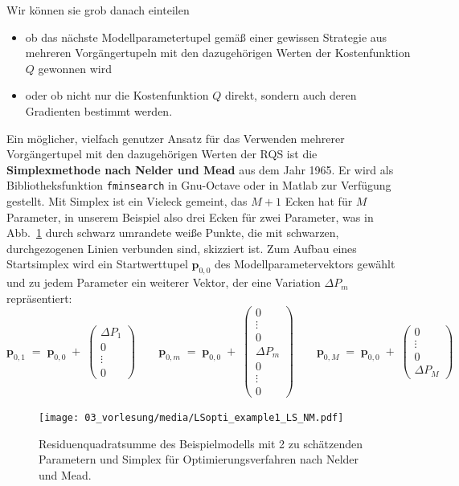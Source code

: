 Wir können sie grob danach einteilen
\begin{itemize}
\item ob das nächste Modellparametertupel gemäß einer gewissen Strategie aus
mehreren Vor\-gänger\-tupeln mit den dazugehörigen Werten der Kostenfunktion $Q$ gewonnen wird
\item oder ob nicht nur die Kostenfunktion $Q$ direkt, sondern auch deren Gradienten bestimmt
werden.
\end{itemize}
Ein möglicher, vielfach genutzer Ansatz für das Verwenden mehrerer Vorgängertupel mit den dazugehörigen Werten der RQS
ist die \textbf{Simplexmethode nach Nelder und Mead} aus dem Jahr 1965. Er wird als Bibliotheksfunktion \texttt{fminsearch} in Gnu-Octave oder 
in Matlab zur Verfügung gestellt. Mit Simplex ist ein Vieleck gemeint, das $M+1$ Ecken hat für $M$
Parameter, in unserem Beispiel also drei Ecken für zwei Parameter, was in Abb.~\ref{LSoptiExample1NM} durch
schwarz umrandete weiße Punkte, die mit schwarzen, durchgezogenen Linien verbunden sind, skizziert ist. Zum Aufbau eines
Startsimplex wird ein Startwerttupel $\mathbf{p}_{0,0}$ des Modellparametervektors gewählt und zu jedem Parameter ein
weiterer Vektor, der eine Variation $\Delta P_m$ repräsentiert:
\begin{equation}
\mathbf{p}_{0,1} \; = \; \mathbf{p}_{0,0} \; + \; \left(\begin{array}{c}
\Delta P_1 \\
0 \\
\vdots \\
0
\end{array}\right) \qquad
\mathbf{p}_{0,m} \; = \; \mathbf{p}_{0,0} \; + \; \left(\begin{array}{c}
0 \\
\vdots \\
0 \\
\Delta P_m \\
0 \\
\vdots \\
0
\end{array}\right) \qquad
\mathbf{p}_{0,M} \; = \; \mathbf{p}_{0,0} \; + \; \left(\begin{array}{c}
0 \\
\vdots \\
0 \\
\Delta P_M
\end{array}\right)
\end{equation}
\begin{figure}
\begin{center}
\texttt{[image: 03\_vorlesung/media/LSopti\_example1\_LS\_NM.pdf]}
\end{center}
\caption{Residuenquadratsumme des Beispielmodells mit 2 zu schätzenden Parametern
und Simplex für Optimierungsverfahren nach Nelder und Mead.\label{LSoptiExample1NM}}
\end{figure}

